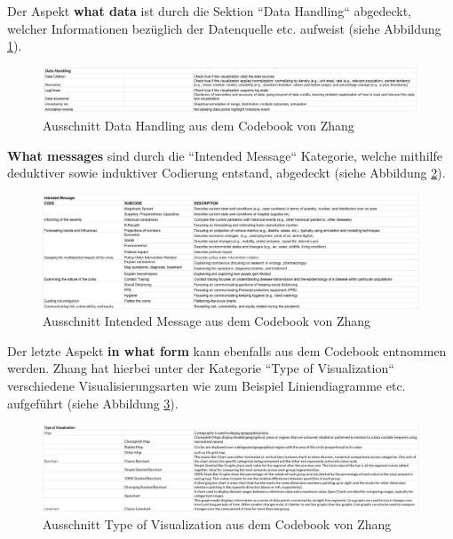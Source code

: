 Der Aspekt \textbf{what data} ist durch die Sektion ``Data Handling`` abgedeckt, welcher Informationen bezüglich der Datenquelle etc. aufweist (siehe Abbildung \ref{fig:zhang_codebook_data_handling}).

\begin{figure}[h]
    \includegraphics[width=12cm]{images/zhang_codebook_data_handling.png}
    \centering
    \caption{Ausschnitt Data Handling aus dem Codebook von Zhang ~\citep{zhang_codebook}}
    \label{fig:zhang_codebook_data_handling}
\end{figure}

 \textbf{What messages} sind durch die ``Intended Message`` Kategorie, welche mithilfe deduktiver sowie induktiver Codierung entstand, abgedeckt (siehe Abbildung \ref{fig:zhang_codebook_intended_message}).

\begin{figure}[h]
    \includegraphics[width=12cm]{images/zhang_codebook_intended_message.png}
    \centering
    \caption{Ausschnitt Intended Message aus dem Codebook von Zhang ~\citep{zhang_codebook}}
    \label{fig:zhang_codebook_intended_message}
\end{figure}

 Der letzte Aspekt \textbf{in what form} kann ebenfalls aus dem Codebook entnommen werden. Zhang hat hierbei unter der Kategorie ``Type of Visualization`` verschiedene Visualisierungsarten wie zum Beispiel Liniendiagramme etc. aufgeführt (siehe Abbildung \ref{fig:zhang_codebook_type_of_visualization}).
 
 
\begin{figure}[h]
    \includegraphics[width=12cm]{images/zhang_codebook_type_of_visualization.png}
    \centering
    \caption{Ausschnitt Type of Visualization aus dem Codebook von Zhang ~\citep{zhang_codebook}}
    \label{fig:zhang_codebook_type_of_visualization}
\end{figure}

